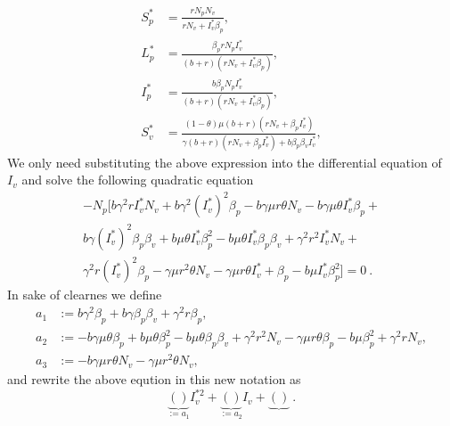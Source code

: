 %
%
\begin{equation*}
	\begin{aligned}
	S^*_p &= 
		\frac{
			r N_p N_v
		}{
			r N_v + 
			I ^ *_v 
			\beta_p
		},
	\\
	L ^ *_p &= 
		\frac{
			\beta_p rN_p I _ v ^ *
		}{
			\left( 
				b + r 
			\right)
			(
				r N_v + I_v ^ * 
				\beta_p
			)
		},
%
%
	\\
	I ^*_p &=
		\frac{
			b \beta_p N_p I_v ^ *
		}{
			 \left(
			 	 b + r 
			 \right)
			 ( r N_v + 
			 	I_v ^ * \beta_p
			 )
		},
	\\
	S ^ *_v &=
		\frac{
			 \left( 
			 	1 - \theta 
			 \right)
			 \mu(b + r)
			 (rN_v + \beta_p I_v^*)
		}{
			\gamma(b + r)
			(r N_v + \beta_p I^*_v) + 
			b \beta_p \beta_v I_v^*
		},
	\end{aligned}
\end{equation*}
%
%
We only need substituting the above expression into the differential equation 
of $I_v$ and solve the following quadratic equation
%
	\begin{multline}
		-N_p [ 
			b \gamma^2 r I^*_v N_v +
			b \gamma^2 (I ^*_v)^2 \beta_p -
			b \gamma \mu r \theta N_v - 
			b \gamma \mu \theta I ^ *_v \beta_p + 
			\\
			b \gamma (I^*_v)^2 \beta_p \beta_v + 
			b \mu \theta I ^ *_v \beta_p ^ 2
			-
			b \mu \theta I ^ *_v \beta_p \beta_v +
			\gamma ^ 2 r ^ 2 I ^ *_v N_v +
			\\
			\gamma ^ 2 r (I ^ *_v) ^ 2 \beta_p - 
			\gamma\mu r^2 \theta N_v - 
			\gamma\mu r \theta I^*_v +
			\beta_p - b\mu I^*_v \beta_p^2
		] = 0 \ .
	\end{multline}
% 
In sake of clearnes we define 
\begin{align*}
	a_1 &:= 
		b \gamma^2 \beta_p + 
		b \gamma \beta_p \beta_v + 
		\gamma^2 r \beta_p
		,\\
	a_2 &:=-b \gamma \mu \theta \beta_p + 
		b \mu \theta \beta_p ^ 2 - 
		b \mu \theta \beta_p \beta_v + 
		\gamma^2 r^2 N_v - 
		\gamma \mu r 
		\theta \beta_p - 
		b \mu \beta_p^ 2 + 
		\gamma ^ 2 r N_v,
	\\
	a_3 &:=-b\gamma\mu r\theta N_v-\gamma\mu r^2\theta N_v, 
\end{align*}
%
and rewrite the above eqution in this new notation as
\begin{equation}
	\underbrace{
		()
	}_{:=a_1}
	I_v^{*2} + 
	\underbrace{()}_{:=a_2} I_v + 
	\underbrace{()} \ .
\end{equation}
